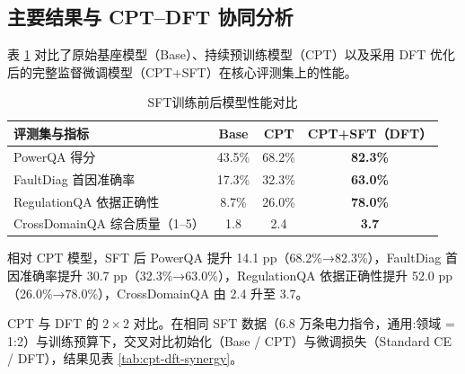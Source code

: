 \documentclass[fontset=fandol,type=master,campus=shenzhen,etitleauto=true]{hithesisbook}
\begin{document}
\subsection{主要结果与 CPT--DFT 协同分析}\label{ux4e3bux8981ux7ed3ux679c-2}

表 \ref{tab:sft-results} 对比了原始基座模型（Base）、持续预训练模型（CPT）以及采用 DFT 优化后的完整监督微调模型（CPT+SFT）在核心评测集上的性能。

\begin{table}[htbp]
\centering
\caption{SFT训练前后模型性能对比}
\label{tab:sft-results}
\small
\begin{tabular}{l c c c}
\toprule
\textbf{评测集与指标} & \textbf{Base} & \textbf{CPT} & \textbf{CPT+SFT（DFT）} \\
\midrule
PowerQA 得分 & 43.5\% & 68.2\% & \textbf{82.3\%} \\
FaultDiag 首因准确率 & 17.3\% & 32.3\% & \textbf{63.0\%} \\
RegulationQA 依据正确性 & 8.7\% & 26.0\% & \textbf{78.0\%} \\
CrossDomainQA 综合质量（1--5） & 1.8 & 2.4 & \textbf{3.7} \\
\bottomrule
\end{tabular}
\end{table}

相对 CPT 模型，SFT 后 PowerQA 提升 14.1 pp（68.2\%→82.3\%），FaultDiag 首因准确率提升 30.7 pp（32.3\%→63.0\%），RegulationQA 依据正确性提升 52.0 pp（26.0\%→78.0\%），CrossDomainQA 由 2.4 升至 3.7。

CPT 与 DFT 的 $2 \times 2$ 对比。在相同 SFT 数据（6.8 万条电力指令，通用:领域 = 1:2）与训练预算下，交叉对比初始化（Base / CPT）与微调损失（Standard CE / DFT），结果见表 \ref{tab:cpt-dft-synergy}。

\begin{table}[htbp]
\centering
\caption{初始化基座（Base vs.\ CPT）与微调目标（Standard CE vs.\ DFT）的 $2 \times 2$ 对比结果}
\label{tab:cpt-dft-synergy}
\small
\setlength{\tabcolsep}{4pt}
\renewcommand{\arraystretch}{1.15}
\end{table}
\end{document}
